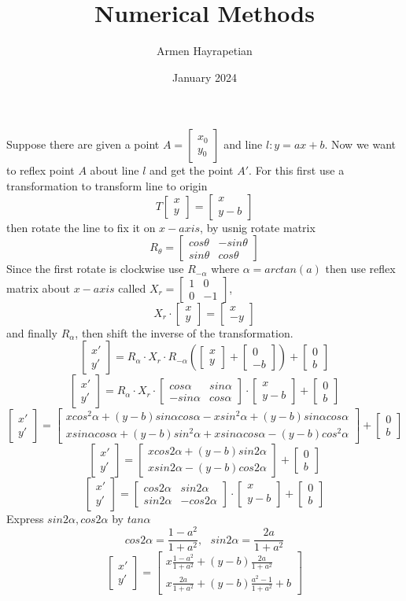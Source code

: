 \documentclass{report}
\title{Numerical Methods}
\author{Armen Hayrapetian}
\date{January 2024}
\newcommand{\cv}[2]{\begin{bmatrix}
    #1\\ 
    #2
    \end{bmatrix}}
\newcommand{\M}[4]{\begin{bmatrix}
   #1 & #2\\ 
   #3 & #4
   \end{bmatrix}}
\begin{document}

Suppose there are given a point $A=\cv{x_0}{y_0}$ and line $l: y = ax+b$. Now we want 
to reflex point $A$ about line $l$ and get the point $A'$. 
For this first use a transformation to transform line to origin 
$$T \cv{x}{y}= \cv{x}{y-b}$$
then rotate the line to fix it on $x-axis$, by usnig rotate matrix 
$$R_\theta = \M{cos \theta} {-sin \theta} {sin \theta}{cos \theta} $$
Since the first rotate is clockwise use $R_{-\alpha}$ where $\alpha= arctan(a)$
then use reflex matrix about $x-axis$ called $X_r=\M{1}{0}{0}{-1}$,$$X_r \cdot \cv{x}{y}= \cv{x}{-y}$$ 
and finally $R_{\alpha}$, then shift the inverse of the transformation.
$$\cv{x'}{y'}=R_{\alpha} \cdot X_r \cdot R_{-\alpha}(\cv{x}{y}+\cv{0}{-b}) + \cv{0}{b}$$
$$\cv{x'}{y'}=R_{\alpha} \cdot X_r 
\cdot \M{cos \alpha} {sin \alpha} {-sin \alpha}{cos \alpha}\cdot \cv{x}{y-b}+ \cv{0}{b}$$
$$\cv{x'}{y'}=\cv{xcos^2\alpha+(y-b)sin \alpha cos \alpha -xsin^2\alpha+(y-b)sin \alpha cos \alpha}
{xsin \alpha cos \alpha +(y-b)sin^2 \alpha +xsin \alpha cos \alpha -(y-b)cos^2 \alpha }+\cv{0}{b}$$
$$\cv{x'}{y'}=\cv{x cos2 \alpha +(y-b) sin 2 \alpha}{x sin2 \alpha -(y-b) cos 2 \alpha}+\cv{0}{b}$$
$$\cv{x'}{y'}= \M{cos2 \alpha}{sin2 \alpha}{sin2 \alpha}{- cos2 \alpha} \cdot \cv{x}{y-b}+\cv{0}{b}$$
Express $sin2 \alpha, cos 2 \alpha$ by $tan \alpha$
$$cos 2\alpha = \frac{1-a^2}{1+a^2}, \text{ } sin 2 \alpha = \frac{2a}{1+a^2}$$
$$\cv{x'}{y'}= \cv{x \frac{1-a^2}{1+a^2}+(y-b) \frac{2a}{1+a^2}}{ x\frac{2a}{1+a^2}+(y-b) \frac{a^2-1}{1+a^2}+b}$$
\end{document}
